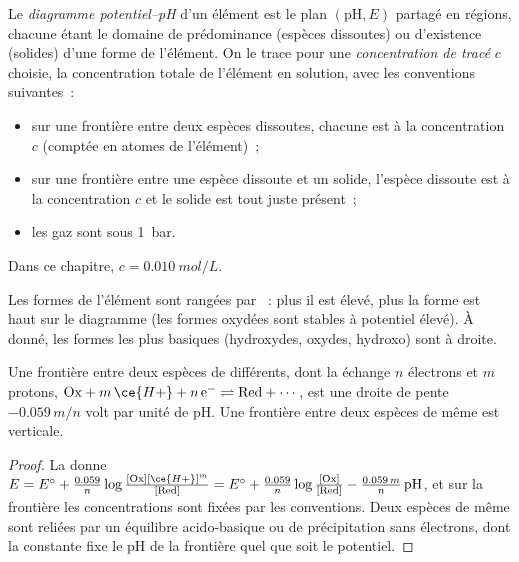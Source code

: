 \begin{definition}\label{def:b1:e-ph-diagrams:e-ph-diagram}
Le \emph{diagramme potentiel--pH} d'un
élément est le plan $(\mathrm{pH}, E)$ partagé en régions, chacune étant
le domaine de prédominance (espèces dissoutes) ou d'existence (solides)
d'une forme de l'élément. On le trace pour une \emph{concentration de
tracé} $c$ choisie, la concentration totale de
l'élément en solution, avec les conventions suivantes~:
\begin{itemize}
  \item sur une frontière entre deux espèces dissoutes, chacune est à la
        concentration $c$ (comptée en atomes de l'élément)~;
  \item sur une frontière entre une espèce dissoute et un solide,
        l'espèce dissoute est à la concentration $c$ et le solide est
        tout juste présent~;
  \item les gaz sont sous \qty{1}{bar}.
\end{itemize}
Dans ce chapitre, $c = \qty{0.010}{mol/L}$.
\end{definition}

Les formes de l'élément sont rangées par ~: plus il
est élevé, plus la forme est haut sur le diagramme (les formes oxydées
sont stables à potentiel élevé). À  donné, les formes
les plus basiques (hydroxydes, oxydes,  hydroxo) sont à droite.

\begin{proposition}\label{prop:b1:e-ph-diagrams:boundary-slope}
Une frontière entre deux espèces de  différents, dont
la  échange $n$ électrons et $m$ protons,
$\mathrm{Ox} + m\,\ce{H+} + n\,\mathrm{e^-} \rightleftharpoons \mathrm{Red} +
\cdots$, est une droite de pente $-0.059\,m/n$ volt par unité de pH. Une
frontière entre deux espèces de même  est verticale.
\end{proposition}

\begin{proof}
La  donne $E = E^\circ + \frac{0.059}{n}\log\frac{[\mathrm{Ox}]
[\ce{H+}]^m}{[\mathrm{Red}]} = E^\circ + \frac{0.059}{n}\log\frac{[\mathrm{Ox}]}
{[\mathrm{Red}]} - \frac{0.059\,m}{n}\,\mathrm{pH}$, et sur la frontière
les concentrations sont fixées par les conventions. Deux espèces de même
 sont reliées par un équilibre acido-basique ou de
précipitation sans électrons, dont la constante fixe le pH de la
frontière quel que soit le potentiel.
\end{proof}

